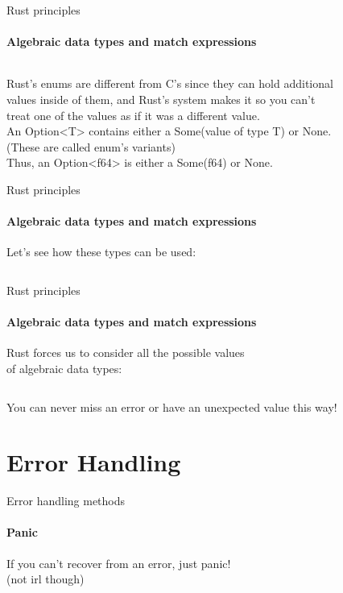\documentclass[usenames,dvipsnames,10pt,aspectratio=169]{beamer}
\begin{document}
\begin{frame}{Rust principles}
\framesubtitle{Algebraic data types and match expressions}
\large
\inputminted[fontsize=\large]{rust}{code/option1.rs}
\vspace{0.4cm}
\normalsize
Rust's \textcolor{ucuyellow}{enum}s are different from C's since they can hold additional\\
values inside of them, and Rust's system makes it so you can't\\
treat one of the values as if it was a different value.\\

\vspace{0.2cm}
An \textcolor{ucuyellow}{Option<T>}
contains either a \textcolor{ucuyellow}{Some(value of type T)}
or \textcolor{ucuyellow}{None}.\\
(These are called enum's variants)\\

Thus, an \textcolor{ucuyellow}{Option<f64>}
is either a \textcolor{ucuyellow}{Some(f64)}
or \textcolor{ucuyellow}{None}.
\end{frame}
\begin{frame}{Rust principles}
\framesubtitle{Algebraic data types and match expressions}
\large	
Let's see how these types can be used:
\vspace{0.2cm}
\inputminted[fontsize=\large]{rust}{code/option2.rs}
\end{frame}

\begin{frame}{Rust principles}
\framesubtitle{Algebraic data types and match expressions}
\large
Rust forces us to consider all the possible values\\
of algebraic data types:
\vspace{0.3cm}
\inputminted[fontsize=\large]{rust}{code/option3.rs}
\vspace{0.3cm}
You can never miss an error or have an unexpected value this way!
\vspace{0.4cm}
\end{frame}


\section{Error Handling}

\begin{frame}{Error handling methods}
	\framesubtitle{Panic}
\large
If you can't recover from an error, just \textcolor{ucuyellow}{panic!}\\
(not irl though)
\vspace{0.9cm}
\inputminted[fontsize=\Large]{rust}{code/error1.rs}
\normalsize
\end{frame}
\end{document}
